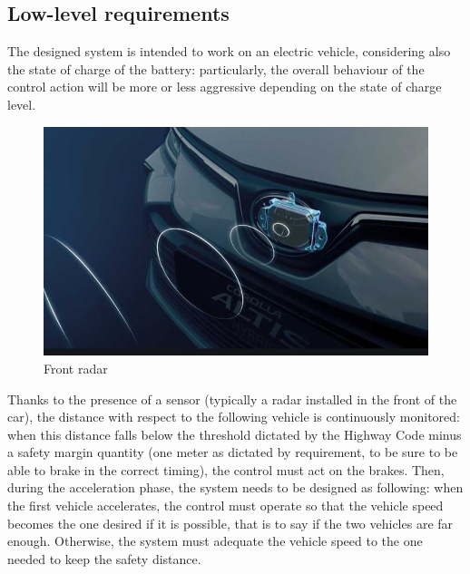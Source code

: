 \documentclass[12pt,a4paper]{report}
\begin{document}
\subsection{Low-level requirements}
The designed system is intended to work on an electric vehicle, considering also the state of charge of the battery: particularly, the overall behaviour of the control action will be more or less aggressive depending on the state of charge level.

\begin{figure}[htbp]
	\centering
	\includegraphics{RadarACC.jpg}
	\caption{Front radar}
\end{figure}

Thanks to the presence of a sensor (typically a radar installed in the front of the car), the distance with respect to the following vehicle is continuously monitored: when this distance falls below the threshold dictated by the Highway Code minus a safety margin quantity (one meter as dictated by requirement, to be sure to be able to brake in the correct timing), the control must act on the brakes. Then, during the acceleration phase, the system needs to be designed as following: when the first vehicle accelerates, the control must operate so that the vehicle speed becomes the one desired if it is possible,  that is to say if the two vehicles are far enough. Otherwise, the system must adequate the vehicle speed to the one needed to keep the safety distance.
\end{document}
